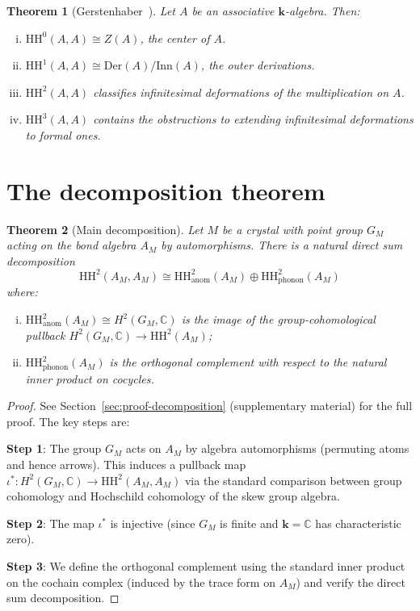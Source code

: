 \documentclass[12pt,a4paper]{article}
\newtheorem{theorem}{Theorem}[section]
\newcommand{\HH}{\mathrm{HH}}
\newcommand{\kk}{\mathbf{k}}
\newcommand{\CC}{\mathbb{C}}
\begin{document}
\begin{theorem}[Gerstenhaber~\cite{gerstenhaber1963}]
\label{thm:gerstenhaber}
Let $A$ be an associative $\kk$-algebra. Then:
\begin{enumerate}[(i)]
  \item $\HH^0(A, A) \cong Z(A)$, the center of $A$.
  \item $\HH^1(A, A) \cong \mathrm{Der}(A)/\mathrm{Inn}(A)$,
    the outer derivations.
  \item $\HH^2(A, A)$ classifies infinitesimal deformations of
    the multiplication on $A$.
  \item $\HH^3(A, A)$ contains the obstructions to extending
    infinitesimal deformations to formal ones.
\end{enumerate}
\end{theorem}

\section{The decomposition theorem}
\label{sec:decomposition}

\begin{theorem}[Main decomposition]
\label{thm:main-decomposition}
Let $M$ be a crystal with point group $G_M$ acting on the bond
algebra $A_M$ by automorphisms. There is a natural direct sum
decomposition
\[
  \HH^2(A_M, A_M) \cong \HH^2_{\mathrm{anom}}(A_M) \oplus
  \HH^2_{\mathrm{phonon}}(A_M)
\]
where:
\begin{enumerate}[(i)]
  \item $\HH^2_{\mathrm{anom}}(A_M) \cong H^2(G_M, \CC)$ is the
    image of the group-cohomological pullback
    $H^2(G_M, \CC) \to \HH^2(A_M)$;
  \item $\HH^2_{\mathrm{phonon}}(A_M)$ is the orthogonal complement
    with respect to the natural inner product on cocycles.
\end{enumerate}
\end{theorem}

\begin{proof}
See Section~\ref{sec:proof-decomposition} (supplementary material)
for the full proof. The key steps are:

\textbf{Step 1}: The group $G_M$ acts on $A_M$ by algebra
automorphisms (permuting atoms and hence arrows). This induces a
pullback map $\iota^*: H^2(G_M, \CC) \to \HH^2(A_M, A_M)$ via
the standard comparison between group cohomology and Hochschild
cohomology of the skew group algebra.

\textbf{Step 2}: The map $\iota^*$ is injective (since $G_M$ is
finite and $\kk = \CC$ has characteristic zero).

\textbf{Step 3}: We define the orthogonal complement using the
standard inner product on the cochain complex (induced by the
trace form on $A_M$) and verify the direct sum decomposition.
\end{proof}
\end{document}

